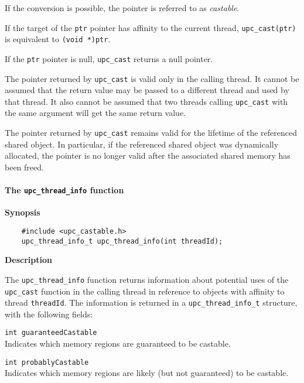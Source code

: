 \np If the conversion is possible, the pointer is referred to as {\em castable}.

\np If the target of the {\tt ptr} pointer has affinity to the current
thread, {\tt upc\_cast(ptr)} is equivalent to {\tt (void *)ptr}.

\np If the {\tt ptr} pointer is null, {\tt upc\_cast} returns a null pointer.

\np The pointer returned by {\tt upc\_cast} is valid only in the calling
thread.  It cannot be assumed that the return value may be passed to
a different thread and used by that thread.  It also cannot be assumed that two
threads calling {\tt upc\_cast} with the same argument will get the same
return value.

\np The pointer returned by {\tt upc\_cast} remains valid for the lifetime
of the referenced shared object.  In particular, if the referenced shared
object was dynamically allocated, the pointer is no longer valid after the 
associated shared memory has been freed.

\paragraph{The {\tt upc\_thread\_info} function}

{\bf Synopsis}

\npf\vspace{-2.5em}
\begin{verbatim}
    #include <upc_castable.h>
    upc_thread_info_t upc_thread_info(int threadId);
\end{verbatim}

{\bf Description}

\np The {\tt upc\_thread\_info} function returns information about
potential uses of the {\tt upc\_cast} function in the calling
thread in reference to objects with
affinity to thread {\tt threadId}.  The information is returned in a
{\tt upc\_thread\_info\_t} structure, with the following fields:

\begin{description}
\item{\tt int guaranteedCastable} \hfill \\
Indicates which memory regions are guaranteed to be castable.
\item{\tt int probablyCastable} \hfill \\
Indicates which memory regions are likely (but not guaranteed)
to be castable.
\end{description}

